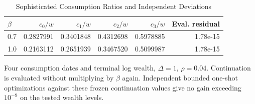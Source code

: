 \begin{table}[tbp]
\centering
\caption{Sophisticated Consumption Ratios and Independent Deviations}
\label{tab:temporal}
\small
\begin{tabular}{@{}lrrrrr@{}}
\toprule
$\beta$ & $c_0/w$ & $c_1/w$ & $c_2/w$ & $c_3/w$ & Eval. residual \\
\midrule
0.7 & 0.2827991 & 0.3401848 & 0.4312698 & 0.5978885 & 1.78e-15 \\
1.0 & 0.2163112 & 0.2651939 & 0.3467520 & 0.5099987 & 1.78e-15 \\
\bottomrule
\end{tabular}
\par\smallskip\begin{minipage}{\linewidth}\footnotesize Four consumption dates and terminal log wealth, $\Delta=1$, $\rho=0.04$. Continuation is evaluated without multiplying by $\beta$ again. Independent bounded one-shot optimizations against these frozen continuation values give no gain exceeding $10^{-9}$ on the tested wealth levels.\end{minipage}
\end{table}
